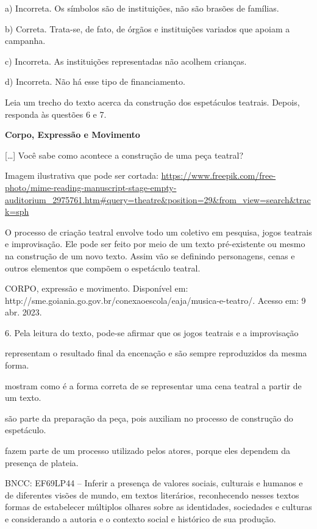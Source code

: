 \begin{escolha}
\begin{escolha}
\begin{escolha}
\begin{escolha}
\begin{escolha}
a) Incorreta. Os símbolos são de instituições, não são brasões de
famílias.

b) Correta. Trata-se, de fato, de órgãos e instituições variados que
apoiam a campanha.

c) Incorreta. As instituições representadas não acolhem crianças.

d) Incorreta. Não há esse tipo de financiamento.

Leia um trecho do texto acerca da construção dos espetáculos teatrais.
Depois, responda às questões 6 e 7.

\textbf{Corpo, Expressão e Movimento}

{[}\ldots{}{]} Você sabe como acontece a construção de uma peça teatral?

Imagem ilustrativa que pode ser cortada:
\url{https://www.freepik.com/free-photo/mime-reading-manuscript-stage-empty-auditorium_2975761.htm\#query=theatre\&position=29\&from_view=search\&track=sph}

O processo de criação teatral envolve todo um coletivo em pesquisa,
jogos teatrais e improvisação. Ele pode ser feito por meio de um texto
pré-existente ou mesmo na construção de um novo texto. Assim vão se
definindo personagens, cenas e outros elementos que compõem o espetáculo
teatral.

CORPO, expressão e movimento. Disponível em:
http://sme.goiania.go.gov.br/conexaoescola/eaja/musica-e-teatro/. Acesso
em: 9 abr. 2023.

6. Pela leitura do texto, pode-se afirmar que os jogos teatrais e a
improvisação

\begin{escolha}
\item representam o resultado final da encenação e são sempre reproduzidos
da mesma forma.

\item mostram como é a forma correta de se representar uma cena teatral a
partir de um texto.

\item são parte da preparação da peça, pois auxiliam no processo de
construção do espetáculo.

\item fazem parte de um processo utilizado pelos atores, porque eles
dependem da presença de plateia.
\end{escolha}

BNCC: EF69LP44 -- Inferir a presença de valores sociais, culturais e
humanos e de diferentes visões de mundo, em textos literários,
reconhecendo nesses textos formas de estabelecer múltiplos olhares sobre
as identidades, sociedades e culturas e considerando a autoria e o
contexto social e histórico de sua produção.


\end{escolha}
\end{escolha}
\end{escolha}
\end{escolha}
\end{escolha}

